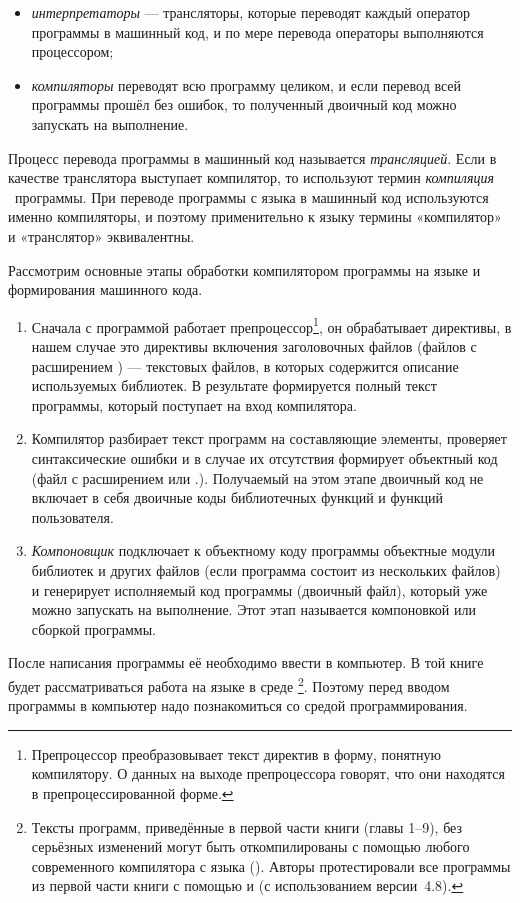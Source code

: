 \begin{itemize}
\item {}\emph{интерпретаторы} --- трансляторы, которые переводят 
каждый оператор программы в машинный код, и по мере перевода операторы
выполняются процессором; 
\item {}\emph{компиляторы} переводят всю программу целиком, и если 
перевод всей программы прошёл без ошибок, то полученный двоичный код можно
запускать на выполнение. 
\end{itemize}
Процесс перевода программы в машинный код называется \emph{трансляцией}. 
Если в качестве транслятора выступает компилятор, то используют термин \emph{компиляция}%
~программы. При переводе программы с языка  в машинный код используются именно 
компиляторы, и поэтому применительно к
языку  термины «компилятор» и «транслятор» эквивалентны.

Рассмотрим основные этапы обработки компилятором программы на языке  и формирования машинного кода.

\begin{enumerate}
\item Сначала с программой работает препроцессор\footnote{Препроцессор преобразовывает
текст директив в форму, понятную компилятору. О данных на выходе препроцессора говорят, что они находятся
в препроцессированной форме.}, он обрабатывает директивы, в нашем случае это директивы включения
заголовочных файлов (файлов с расширением ) --- текстовых файлов, в которых содержится описание используемых
библиотек. В результате формируется полный текст программы, который поступает на вход компилятора. 
\item Компилятор разбирает текст программ на составляющие элементы, проверяет синтаксические ошибки и в случае их
отсутствия формирует объектный код (файл с расширением  или .). Получаемый на этом этапе
двоичный код не включает в себя двоичные коды библиотечных функций и функций пользователя.
\item \emph{Компоновщик} подключает к объектному коду программы объектные модули библиотек и других 
файлов (если программа состоит из нескольких
файлов) и генерирует исполняемый код программы (двоичный файл), который уже можно запускать на выполнение. Этот этап
называется компоновкой или сборкой программы.
\end{enumerate}

После написания программы её необходимо ввести в компьютер. В той книге будет рассматриваться работа на языке  в
среде \footnote{Тексты программ, приведённые в первой части книги (главы 1--9), без серьёзных изменений
могут быть откомпилированы с помощью любого современного компилятора с языка (). Авторы протестировали все
программы из первой части книги с помощью   и   (с использованием  версии~4.8).}. 
Поэтому перед
вводом программы в компьютер надо познакомиться со средой программирования.

